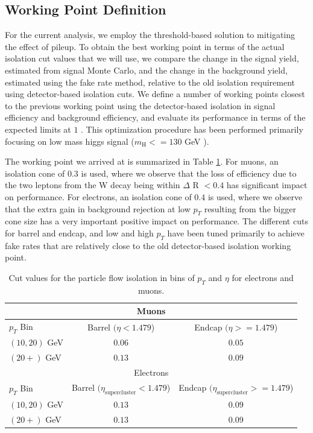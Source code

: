 


\subsection{Working Point Definition}

For the current analysis, we employ the threshold-based solution to mitigating the effect of pileup. 
To obtain the best working point in terms of the actual isolation
cut values that we will use, we compare the change in the signal yield, estimated from signal
Monte Carlo, and the change in the background yield, estimated using the fake rate method,
relative to the old isolation requirement using detector-based isolation cuts. We define a number
of working points closest to the previous working point using the detector-based isolation in
signal efficiency and background efficiency, and evaluate its performance in terms of the
expected limits at $1$ \ifb. This optimization procedure has been performed primarily focusing on
low mass higgs signal ($m_{\mathrm{H}} <= 130$ GeV ). 

The working point we arrived at is summarized in Table \ref{tab:PFIsoWorkingPoint}. For muons, an isolation cone of
$0.3$ is used, where we observe that the loss of efficiency due to the two leptons from the
W decay being within $\Delta$ R $ < 0.4$ has significant impact on performance. For electrons, an
isolation cone of $0.4$ is used, where we observe that the extra gain in background rejection
at low $p_{T}$ resulting from the bigger cone size has a very important positive impact on 
performance. The different cuts for barrel and endcap, and low and high $p_{T}$ have been tuned
primarily to achieve fake rates that are relatively close to the old detector-based
isolation working point.

\begin{table}[!htbp]
\begin{center}
\begin{tabular}{|l|c|c|}
\hline
\multicolumn{3}{|c|}{Muons} \\
\hline
$p_{T}$ Bin      & Barrel $(\eta < 1.479$) & Endcap $(\eta >= 1.479$) \\
\hline
$(10,20)$ GeV  &  $0.06$    & $0.05$     \\
$(20+)$ GeV    &  $0.13$    & $0.09$     \\
\hline
\multicolumn{3}{|c|}{Electrons} \\
\hline
$p_{T}$ Bin      & Barrel $(\eta_{\mathrm{supercluster}} < 1.479$) & Endcap $(\eta_{\mathrm{supercluster}} >= 1.479$) \\

\hline
$(10,20)$ GeV  &  $0.13$    & $0.09$     \\
$(20+)$ GeV    &  $0.13$    & $0.09$     \\

\hline
\end{tabular}
\caption{Cut values for the particle flow isolation in bins of $p_{T}$ and $\eta$ for electrons
and muons.  }
\label{tab:PFIsoWorkingPoint}
\end{center}
\end{table}

